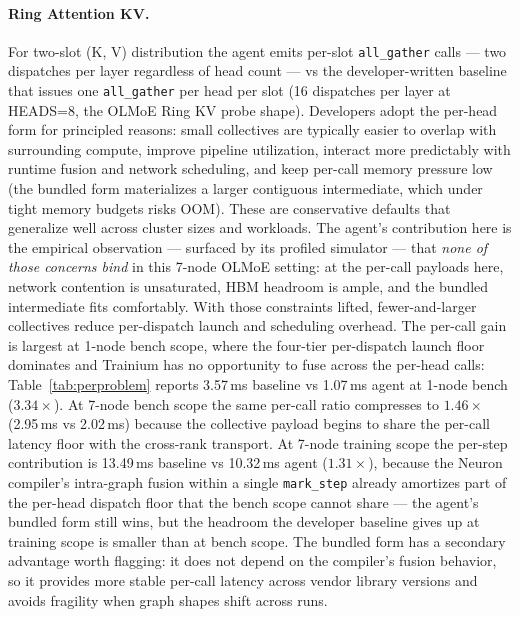 \paragraph{Ring Attention KV.} For two-slot (K, V) distribution the
agent emits per-slot \texttt{all\_gather} calls --- two dispatches
per layer regardless of head count --- vs the developer-written
baseline that issues one \texttt{all\_gather} per head per slot
(16 dispatches per layer at HEADS=8, the OLMoE Ring KV probe shape).
Developers adopt the per-head form for principled reasons: small
collectives are typically easier to overlap with surrounding
compute, improve pipeline utilization, interact more predictably
with runtime fusion and network scheduling, and keep per-call
memory pressure low (the bundled form materializes a larger
contiguous intermediate, which under tight memory budgets risks
OOM). These are conservative defaults that generalize well across
cluster sizes and workloads.
The agent's contribution here is the empirical observation ---
surfaced by its profiled simulator --- that \emph{none of those
concerns bind} in this 7-node OLMoE setting: at the per-call
payloads here, network contention is unsaturated, HBM headroom is
ample, and the bundled intermediate fits comfortably. With those
constraints lifted, fewer-and-larger collectives reduce
per-dispatch launch and scheduling overhead. The per-call gain
is largest at 1-node bench scope, where the four-tier per-dispatch
launch floor dominates and Trainium has no opportunity to fuse
across the per-head calls: Table~\ref{tab:perproblem} reports
3.57\,ms baseline vs 1.07\,ms agent at 1-node bench
($3.34\times$). At 7-node bench scope the same per-call ratio
compresses to $1.46\times$ (2.95\,ms vs 2.02\,ms) because the
collective payload begins to share the per-call latency floor
with the cross-rank transport. At 7-node training scope the
per-step contribution is 13.49\,ms baseline vs 10.32\,ms agent
($1.31\times$), because the Neuron compiler's intra-graph
fusion within a single \texttt{mark\_step} already amortizes
part of the per-head dispatch floor that the bench scope cannot
share --- the agent's bundled form still wins, but the headroom
the developer baseline gives up at training scope is smaller than
at bench scope. The bundled form has a secondary advantage worth
flagging: it does not depend on the compiler's fusion behavior,
so it provides more stable per-call latency across vendor library
versions and avoids fragility when graph shapes shift across
runs.

